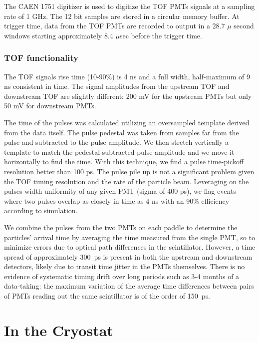 The CAEN 1751 digitizer is used to digitize the TOF PMTs signals at a sampling rate of 1 GHz. The 12 bit samples are stored in a circular memory buffer. At trigger time, data from the TOF PMTs are recorded to output in a 28.7 $\mu$ second windows starting  approximately 8.4 $\mu$sec before the trigger time. 



\subsubsection{TOF functionality}\label{sec:MWPCfunc}


The TOF signals rise time (10-90\%) is 4 ns and a full width, half-maximum of 9 ns consistent in time. The signal amplitudes from the upstream TOF and  downstream TOF are slightly different:  200 mV for the upstream PMTs but only 50 mV for downstream PMTs. 

The time of the pulses was calculated utilizing an oversampled template derived from the data itself. The pulse pedestal was taken from samples far from the pulse and subtracted to the pulse amplitude. We then stretch vertically a template to match the pedestal-subtracted pulse amplitude and we move it horizontally to find the time. With this technique, we find a pulse time-pickoff resolution better than 100 ps.  The pulse pile up is not a significant problem given the TOF timing resolution and the rate of the particle beam.  Leveraging on the pulses width uniformity of any given PMT (sigma of 400 ps),  we flag events where two pulses overlap as closely in time as 4 ns with an 90\% efficiency according to simulation. 


We combine the pulses from the two PMTs on each paddle to determine the particles' arrival time by averaging the time measured from the single PMT, so to minimize errors due to optical path differences in the scintillator.  However, a time spread of approximately 300~ps is present in both the upstream and downstream detectors, likely due to transit time jitter in the PMTs themselves.  There is no evidence of systematic timing drift over long periods such as 3-4 months of a data-taking: the maximum variation of the average time differences between pairs of PMTs reading out the same scintillator is of the order of 150~ps.



\section{In the Cryostat}

